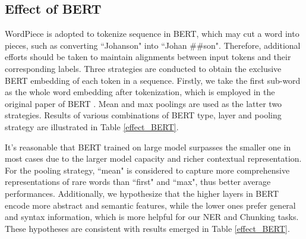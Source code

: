 \documentclass[11pt,a4paper]{article}
\begin{document}
\begin{table*}[t!]
\begin{center}
\end{center}
\caption{  scores on the CoNLL03 and parameter sizes of various models, where ``GRU-384" indicates the conventional GRU with hidden size of 384, while ``DT2-128" refers to deep transition RNN with transition number of 2 and hidden size of 128, similarly for ``DT4-256".}
\label{model_complexity}
\end{table*}

\subsection{Effect of BERT}
WordPiece is adopted to tokenize sequence in BERT, which may cut a word into pieces, such as converting ``Johanson" into ``Johan \#\#son". Therefore, additional efforts should be taken to maintain alignments between input tokens and their corresponding labels.
Three strategies are conducted to obtain the exclusive BERT embedding of each token in a sequence. Firstly, we take the first sub-word as the whole word embedding after tokenization, which is employed in the original paper of BERT \cite{BERT}. Mean and max poolings are used as the latter two strategies. Results of various combinations of BERT type, layer and pooling strategy are illustrated in Table \ref{effect_BERT}.

It's reasonable that BERT trained on large model surpasses the smaller one in most cases due to the larger model capacity and richer contextual representation. For the pooling strategy, ``mean" is considered to capture more comprehensive representations of rare words than ``first" and ``max", thus better average performances. Additionally, we hypothesize that the higher layers in BERT encode more abstract and semantic features, while the lower ones prefer general and syntax information, which is more helpful for our NER and Chunking tasks. These hypotheses are consistent with results emerged in Table \ref{effect_BERT}.
\end{document}
